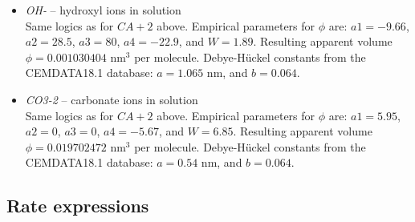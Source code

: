\documentclass[12pt]{paper}    %
\begin{document}
\begin{itemize}
%
\item \textit{OH-} -- hydroxyl ions in solution \\
Same logics as for $CA+2$ above. Empirical parameters for $\phi$ are: $a1 = -9.66$, $a2 = 28.5$, $a3 = 80$, $a4 = -22.9$, and $W = 1.89$. Resulting apparent volume $\phi = 0.001030404$ nm$^3$ per molecule. Debye-H\"uckel constants from the CEMDATA18.1 database: $a = 1.065$ nm, and $b = 0.064$.
%
\item \textit{CO3-2} -- carbonate ions in solution \\
Same logics as for $CA+2$ above. Empirical parameters for $\phi$ are: $a1 = 5.95$, $a2 = 0$, $a3 = 0$, $a4 = -5.67$, and $W = 6.85$. Resulting apparent volume $\phi = 0.019702472$ nm$^3$ per molecule. Debye-H\"uckel constants from the CEMDATA18.1 database: $a =0.54$ nm, and $b = 0.064$.
\end{itemize}




\subsection{Rate expressions}
\end{document}
